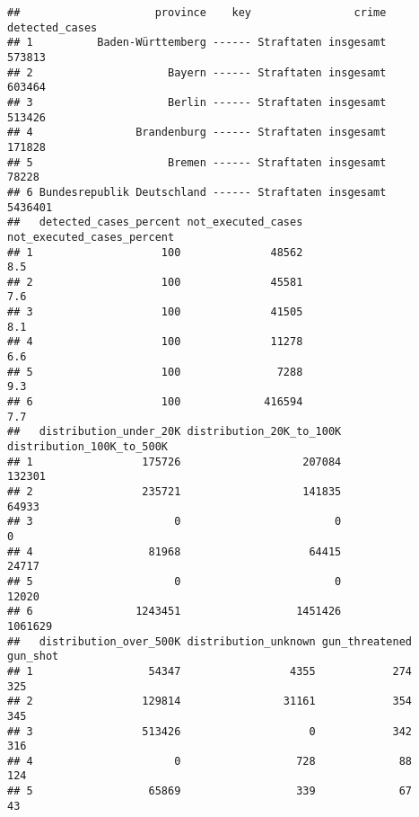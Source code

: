 \documentclass[
]{article}
\newenvironment{Shaded}{\begin{snugshade}}{\end{snugshade}}
\newcommand{\DataTypeTok}[1]{\textcolor[rgb]{0.13,0.29,0.53}{#1}}
\newcommand{\KeywordTok}[1]{\textcolor[rgb]{0.13,0.29,0.53}{\textbf{#1}}}
\newcommand{\NormalTok}[1]{#1}
\newcommand{\OperatorTok}[1]{\textcolor[rgb]{0.81,0.36,0.00}{\textbf{#1}}}
\newcommand{\StringTok}[1]{\textcolor[rgb]{0.31,0.60,0.02}{#1}}
\begin{document}
\begin{Shaded}
\end{Shaded}

\begin{verbatim}
##                     province    key                crime detected_cases
## 1          Baden-Württemberg ------ Straftaten insgesamt         573813
## 2                     Bayern ------ Straftaten insgesamt         603464
## 3                     Berlin ------ Straftaten insgesamt         513426
## 4                Brandenburg ------ Straftaten insgesamt         171828
## 5                     Bremen ------ Straftaten insgesamt          78228
## 6 Bundesrepublik Deutschland ------ Straftaten insgesamt        5436401
##   detected_cases_percent not_executed_cases not_executed_cases_percent
## 1                    100              48562                        8.5
## 2                    100              45581                        7.6
## 3                    100              41505                        8.1
## 4                    100              11278                        6.6
## 5                    100               7288                        9.3
## 6                    100             416594                        7.7
##   distribution_under_20K distribution_20K_to_100K distribution_100K_to_500K
## 1                 175726                   207084                    132301
## 2                 235721                   141835                     64933
## 3                      0                        0                         0
## 4                  81968                    64415                     24717
## 5                      0                        0                     12020
## 6                1243451                  1451426                   1061629
##   distribution_over_500K distribution_unknown gun_threatened gun_shot
## 1                  54347                 4355            274      325
## 2                 129814                31161            354      345
## 3                 513426                    0            342      316
## 4                      0                  728             88      124
## 5                  65869                  339             67       43

\end{verbatim}
\end{document}
